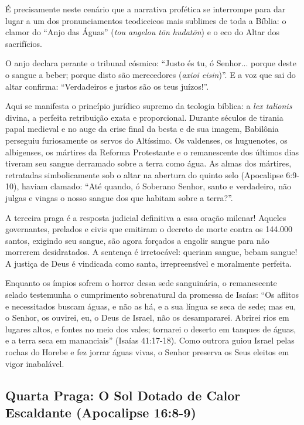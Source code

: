 \documentclass[11pt,a4paper,openany]{book}
\begin{document}
É precisamente neste cenário que a narrativa profética se interrompe para dar lugar a um dos pronunciamentos teodiceicos mais sublimes de toda a Bíblia: o clamor do ``Anjo das Águas'' (\textit{tou angelou tōn hudatōn}) e o eco do Altar dos sacrifícios.

O anjo declara perante o tribunal cósmico: ``Justo és tu, ó Senhor... porque deste o sangue a beber; porque disto são merecedores (\textit{axioi eisin})''. E a voz que sai do altar confirma: ``Verdadeiros e justos são os teus juízos!''.

Aqui se manifesta o princípio jurídico supremo da teologia bíblica: a \textit{lex talionis} divina, a perfeita retribuição exata e proporcional. Durante séculos de tirania papal medieval e no auge da crise final da besta e de sua imagem, Babilônia perseguiu furiosamente os servos do Altíssimo. Os valdenses, os huguenotes, os albigenses, os mártires da Reforma Protestante e o remanescente dos últimos dias tiveram seu sangue derramado sobre a terra como água. As almas dos mártires, retratadas simbolicamente sob o altar na abertura do quinto selo (Apocalipse 6:9-10), haviam clamado: ``Até quando, ó Soberano Senhor, santo e verdadeiro, não julgas e vingas o nosso sangue dos que habitam sobre a terra?''.

A terceira praga é a resposta judicial definitiva a essa oração milenar! Aqueles governantes, prelados e civis que emitiram o decreto de morte contra os 144.000 santos, exigindo seu sangue, são agora forçados a engolir sangue para não morrerem desidratados. A sentença é irretocável: queriam sangue, bebam sangue! A justiça de Deus é vindicada como santa, irrepreensível e moralmente perfeita.

Enquanto os ímpios sofrem o horror dessa sede sanguinária, o remanescente selado testemunha o cumprimento sobrenatural da promessa de Isaías: ``Os aflitos e necessitados buscam águas, e não as há, e a sua língua se seca de sede; mas eu, o Senhor, os ouvirei, eu, o Deus de Israel, não os desampararei. Abrirei rios em lugares altos, e fontes no meio dos vales; tornarei o deserto em tanques de águas, e a terra seca em mananciais'' (Isaías 41:17-18). Como outrora guiou Israel pelas rochas do Horebe e fez jorrar águas vivas, o Senhor preserva os Seus eleitos em vigor inabalável.



\subsection{Quarta Praga: O Sol Dotado de Calor Escaldante (Apocalipse 16:8-9)}
\end{document}

